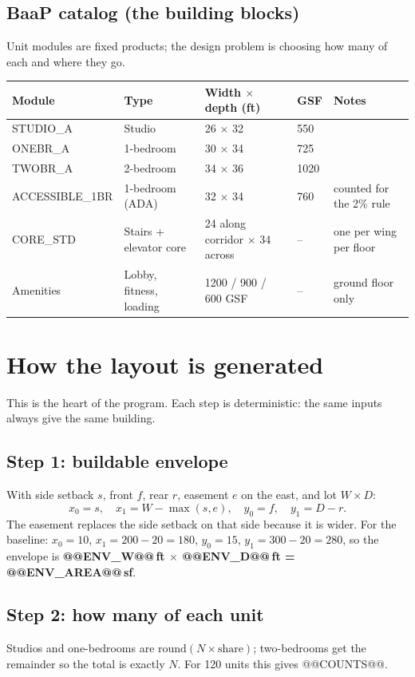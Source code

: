 \documentclass[11pt]{article}
\begin{document}
\subsection{BaaP catalog (the building blocks)}
Unit modules are fixed products; the design problem is choosing how many of each and where they go.
\begin{table}[H]\centering\small
\begin{tabular}{lllll}\toprule
Module & Type & Width $\times$ depth (ft) & GSF & Notes \\ \midrule
STUDIO\_A & Studio & 26 $\times$ 32 & 550 & \\
ONEBR\_A & 1-bedroom & 30 $\times$ 34 & 725 & \\
TWOBR\_A & 2-bedroom & 34 $\times$ 36 & 1020 & \\
ACCESSIBLE\_1BR & 1-bedroom (ADA) & 32 $\times$ 34 & 760 & counted for the 2\% rule \\
CORE\_STD & Stairs + elevator core & 24 along corridor $\times$ 34 across & -- & one per wing per floor \\
Amenities & Lobby, fitness, loading & 1200 / 900 / 600 GSF & -- & ground floor only \\ \bottomrule
\end{tabular}\end{table}

\section{How the layout is generated}
This is the heart of the program. Each step is deterministic: the same inputs always give the same building.

\subsection{Step 1: buildable envelope}
With side setback $s$, front $f$, rear $r$, easement $e$ on the east, and lot $W\times D$:
\[
x_0 = s,\quad x_1 = W - \max(s, e),\quad y_0 = f,\quad y_1 = D - r .
\]
The easement replaces the side setback on that side because it is wider. For the baseline: $x_0=10$, $x_1=200-20=180$, $y_0=15$, $y_1=300-20=280$, so the envelope is
\textbf{@@ENV_W@@\,ft $\times$ @@ENV_D@@\,ft = @@ENV_AREA@@\,sf}.

\subsection{Step 2: how many of each unit}
Studios and one-bedrooms are $\text{round}(N\times\text{share})$; two-bedrooms get the remainder so the total is exactly $N$. For 120 units this gives
@@COUNTS@@.
\end{document}
